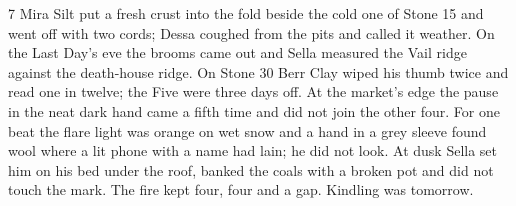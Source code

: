 \begin{CRchronicle}{7}
Mira Silt put a fresh crust into the fold beside the cold one of Stone 15 and went off with two cords; Dessa coughed from the pits and called it weather. On the Last Day’s eve the brooms came out and Sella measured the Vail ridge against the death-house ridge. On Stone 30 Berr Clay wiped his thumb twice and read one in twelve; the Five were three days off. At the market’s edge the pause in the neat dark hand came a fifth time and did not join the other four. For one beat the flare light was orange on wet snow and a hand in a grey sleeve found wool where a lit phone with a name had lain; he did not look. At dusk Sella set him on his bed under the roof, banked the coals with a broken pot and did not touch the mark. The fire kept four, four and a gap. Kindling was tomorrow.
\end{CRchronicle}
